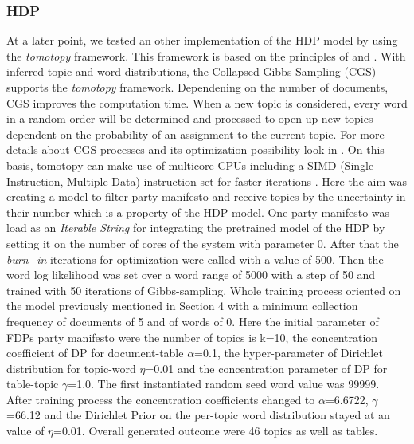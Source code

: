 \subsubsection{HDP}
At a later point, we tested an other implementation of the HDP model by using the \textit{tomotopy} \cite{bab2min_2021_4999089} framework. This framework is based on the principles of \citet{teh2004sharing} and \citet{newman2009distributed}. With inferred topic and word distributions, the Collapsed Gibbs Sampling (CGS) supports the \textit{tomotopy} framework. Dependening on the number of documents, CGS improves the computation time. When a new topic is considered, every word in a random order will be determined and processed to open up new topics dependent on the probability of an assignment to the current topic. For more details about CGS processes and its optimization possibility look in \citet{subeno2018optimisation}. On this basis, tomotopy can make use of multicore CPUs including a SIMD (Single Instruction, Multiple Data) instruction set for faster iterations \citet{bab2min_2021_4999089}. Here the aim was creating a model to filter party manifesto and receive topics by the uncertainty in their number which is a property of the HDP model. One party manifesto was load as an \textit{Iterable String} for integrating the pretrained model of the HDP by setting it on the number of cores of the system with parameter 0. After that the \textit{burn\_in} iterations for optimization were called with a value of 500.
Then the word log likelihood was set over a word range of 5000 with a step of 50 and trained with 50 iterations of Gibbs-sampling.
Whole training process oriented on the model previously mentioned in Section 4 with a minimum collection frequency of documents of 5 and of words of 0. Here the initial parameter of FDPs party manifesto were the number of topics is k=10, the concentration coefficient of DP for document-table $\alpha$=0.1, the hyper-parameter of Dirichlet distribution for topic-word $\eta$=0.01 and the concentration parameter of DP for table-topic $\gamma$=1.0. The first instantiated random seed word value was 99999. After training process the concentration coefficients changed to $\alpha$=6.6722, $\gamma$=66.12 and the Dirichlet Prior on the per-topic word distribution stayed at an value of $\eta$=0.01. Overall generated outcome were 46 topics as well as tables.

